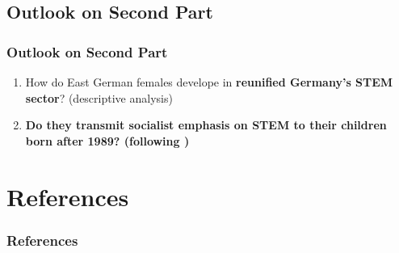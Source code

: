 \documentclass[11pt, aspectratio=1610, xcolor={dvipsnames}]{beamer}
\newcommand{\highlight}[1]{\textbf{\textcolor{PineGreen}{#1}}}
\begin{document}
	\subsection{Outlook on Second Part}
	\begin{frame}
		\frametitle{Outlook on Second Part}
		
		\begin{enumerate}
			\item How do East German females develope in \highlight{reunified Germany's STEM sector}? (descriptive analysis)
			\item \textbf{Do they \highlight{transmit} socialist emphasis on STEM to their children born after 1989? (following \cite{Fernandez2011})}
		\end{enumerate}
		
	\end{frame}
	
	\begin{frame}
		\frametitle{}
		
		
		
	\end{frame}
		
	\section*{References}
	\begin{frame}[allowframebreaks]
		\frametitle{References}
		
		{\scriptsize
		
		}
		
	\end{frame}
	
	\appendix
	
\end{document}
